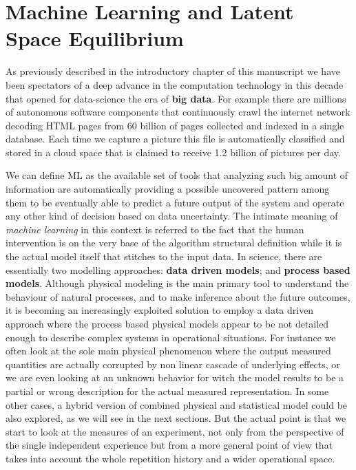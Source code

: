\chapter{Machine Learning and Latent Space Equilibrium}

As previously described in the introductory chapter of this manuscript we have been spectators of a deep advance in the computation technology in this decade that opened for data-science the era of \textbf{big data}. For example there are millions of autonomous software components that continuously crawl the internet network decoding HTML pages from 60 billion of pages collected and indexed in a single database. Each time we capture a picture this file is automatically classified and stored in a cloud space that is claimed to receive 1.2 billion of pictures per day. 

We can define ML as the available set of tools that analyzing such big amount of information are automatically providing a possible uncovered pattern among them to be eventually able to predict a future output of the system and operate any other kind of decision based on data uncertainty. The intimate meaning of \textit{machine learning} in this context is referred to the fact that the human intervention is on the very base of the algorithm structural definition while it is the actual model itself that stitches to the input data.  
%
In science, there are essentially two modelling approaches: \textbf{data driven models}; and \textbf{process based models}.
Although physical modeling is the main primary tool to understand the behaviour of natural processes, and to make inference about the future outcomes, it is becoming an increasingly exploited solution to employ a data driven approach where the process based physical models appear to be not detailed enough to describe complex systems in operational situations. For instance we often look at the sole main physical phenomenon where the output measured quantities are actually corrupted by non linear cascade of underlying effects, or we are even looking at an unknown behavior for witch the model results to be a partial or wrong description for the actual measured representation. 
In some other cases, a hybrid version of combined physical and statistical model could be also explored, as we will see in the next sections. But the actual point is that we start to look at the measures of an experiment, not only from the perspective of the single independent experience but from a more general point of view that takes into account the whole repetition history and a wider operational space.  



